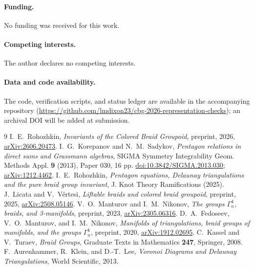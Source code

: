 \documentclass[11pt]{article}
\theoremstyle{plain}
\theoremstyle{definition}
\theoremstyle{remark}
\begin{document}
\paragraph{Funding.} No funding was received for this work.
\paragraph{Competing interests.} The author declares no competing interests.
\paragraph{Data and code availability.} The code, verification scripts, and status ledger are available in
the accompanying repository (\url{https://github.com/lmdixon23/cbg-2026-representation-checks}); an archival
DOI will be added at submission.

\begin{thebibliography}{9}
 I.~E.~Rohozhkin, \emph{Invariants of the Colored Braid Groupoid},
preprint, 2026, \href{https://arxiv.org/abs/2606.20473}{arXiv:2606.20473}.
 I.~G.~Korepanov and N.~M.~Sadykov, \emph{Pentagon relations in direct sums
and Grassmann algebras}, SIGMA Symmetry Integrability Geom. Methods Appl. \textbf{9} (2013), Paper 030,
16 pp. \href{https://doi.org/10.3842/SIGMA.2013.030}{doi:10.3842/SIGMA.2013.030}; \href{https://arxiv.org/abs/1212.4462}{arXiv:1212.4462}.
 I.~E.~Rohozhkin, \emph{Pentagon equations, Delaunay triangulations and the
pure braid group invariant}, J. Knot Theory Ramifications (2025).
 J.~Licata and V.~V\'ertesi, \emph{Liftable braids and colored braid groupoid},
preprint, 2025, \href{https://arxiv.org/abs/2508.05146}{arXiv:2508.05146}.
 V.~O.~Manturov and I.~M.~Nikonov, \emph{The groups $\Gamma^4_n$, braids, and
3-manifolds}, preprint, 2023, \href{https://arxiv.org/abs/2305.06316}{arXiv:2305.06316}.
 D.~A.~Fedoseev, V.~O.~Manturov, and I.~M.~Nikonov, \emph{Manifolds
of triangulations, braid groups of manifolds, and the groups $\Gamma^k_n$}, preprint, 2020,
\href{https://arxiv.org/abs/1912.02695}{arXiv:1912.02695}.
 C.~Kassel and V.~Turaev, \emph{Braid Groups}, Graduate Texts in Mathematics
\textbf{247}, Springer, 2008.
 F.~Aurenhammer, R.~Klein, and D.-T.~Lee, \emph{Voronoi Diagrams and Delaunay
Triangulations}, World Scientific, 2013.
\end{thebibliography}
\end{document}
